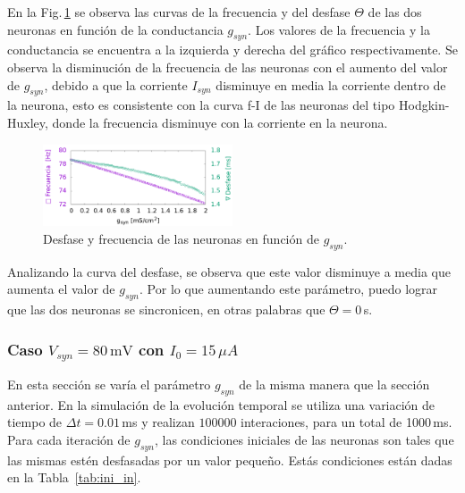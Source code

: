 En la Fig.\,\ref{fig:des_fre} se observa las curvas de la frecuencia y del desfase $\Theta$ de las dos neuronas en función de la conductancia $g_{syn}$. Los valores de la frecuencia y la conductancia se encuentra a la izquierda y derecha del gráfico respectivamente. Se observa la disminución de la frecuencia de las neuronas con el aumento del valor de $g_{syn}$, debido a que la corriente $I_{syn}$ disminuye en media la corriente dentro de la neurona, esto es consistente con la curva f-I de las neuronas del tipo Hodgkin-Huxley, donde la frecuencia disminuye con la corriente en la neurona. 
        \begin{figure}[H]
            \centering
            \includegraphics[width=0.5\textwidth]{current_15.png}
            \caption{Desfase y frecuencia de las neuronas en función de $g_{syn}$.}
            \label{fig:des_fre}
        \end{figure}  

Analizando la curva del desfase, se observa que este valor disminuye a media que aumenta el valor de $g_{syn}$. Por lo que aumentando este parámetro, puedo lograr que las dos neuronas se sincronicen, en otras palabras que $\Theta=0$\,s. 

\subsubsection{Caso \texorpdfstring{$V_{syn}= 80\,\text{mV}$}{}   con  \texorpdfstring{$I_0 = 15\,\mu A$}{}}



En esta sección se varía el parámetro $g_{syn}$ de la misma manera que la sección anterior. En la simulación de la evolución temporal se utiliza una variación de tiempo de $\Delta t =  0.01\,$ms y realizan $100000$ interaciones, para un total de 1000\,ms. Para cada iteración de $g_{syn}$, las condiciones iniciales de las neuronas son tales que las mismas estén desfasadas por un valor pequeño. Estás condiciones están dadas en la Tabla~\ref{tab:ini_in}.

